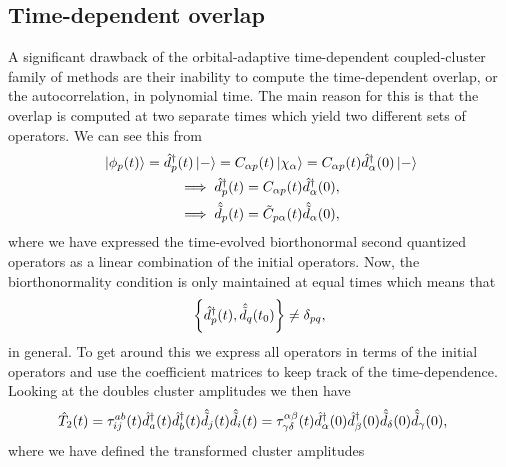         \subsection{Time-dependent overlap}
            \label{subsec:autocorrelation-oatdccd}
            A significant drawback of the orbital-adaptive time-dependent
            coupled-cluster family of methods are their inability to compute the
            time-dependent overlap, or the autocorrelation, in polynomial time.
            The main reason for this is that the overlap is computed at two
            separate times which yield two different sets of operators.
            We can see this from
            \begin{gather}
                \ket*{\phi_p(t)}
                = \hat{d}^{\dagger}_{p}(t)\ket*{-}
                = C_{\alpha p}(t) \ket*{\chi_{\alpha}}
                = C_{\alpha p}(t) \hat{d}^{\dagger}_{\alpha}(0)\ket*{-}
                \\
                \implies
                \hat{d}^{\dagger}_{p}(t) = C_{\alpha p}(t) \hat{d}^{\dagger}_{\alpha}(0),
                \\
                \implies
                \hat{\tilde{d}}_{p}(t) = \tilde{C}_{p \alpha}(t) \hat{\tilde{d}}_{\alpha}(0),
            \end{gather}
            where we have expressed the time-evolved biorthonormal second
            quantized operators as a linear combination of the initial
            operators.
            Now, the biorthonormality condition is only maintained at equal
            times which means that
            \begin{align}
                \left\{\hat{d}^{\dagger}_{p}(t), \hat{\tilde{d}}_{q}(t_0)\right\} \neq \delta_{pq},
            \end{align}
            in general.
            To get around this we express all operators in terms of the initial
            operators and use the coefficient matrices to keep track of the
            time-dependence.
            Looking at the doubles cluster amplitudes we then have
            \begin{align}
                \hat{T}_2(t)
                &= \tau^{ab}_{ij}(t)
                \hat{d}^{\dagger}_{a}(t)\hat{d}^{\dagger}_{b}(t)\hat{\tilde{d}}_{j}(t)\hat{\tilde{d}}_{i}(t)
                = \tau^{\alpha \beta}_{\gamma \delta}(t)
                \hat{d}^{\dagger}_{\alpha}(0)\hat{d}^{\dagger}_{\beta}(0)
                \hat{\tilde{d}}_{\delta}(0)\hat{\tilde{d}}_{\gamma}(0),
                \label{eq:transformed-cluster-operator}
            \end{align}
            where we have defined the transformed cluster amplitudes
